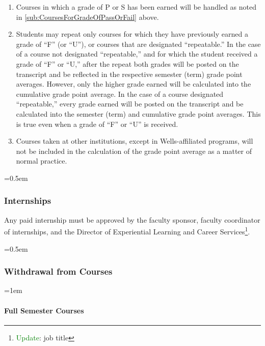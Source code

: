\documentclass{manual}
\newcommand{\modified}[1]{}
\let\oldsubsubsection\subsubsection
\renewcommand\subsubsection{\leftskip=0.5em\oldsubsubsection}
\let\oldparagraph\paragraph
\renewcommand\paragraph{\leftskip=1em\oldparagraph}
\newcommand{\editRemark}[3]{\textcolor{green}{#2}\footnote{\textcolor{green}{#1}: #3}}
\begin{document}
\begin{enumerate}[label=\arabic*]
\item Courses in which a grade of P or S has been earned will be handled as noted in \cref{sub:CoursesForGradeOfPassOrFail} above.

\item Students may repeat only courses for which they have previously earned a grade\modified{4/8/03}  of ``F'' (or ``U''), or courses that are designated ``repeatable.'' In the case of a course not designated ``repeatable,'' and for which the student received a grade of ``F'' or ``U,'' after the repeat both grades will be posted on the transcript and be reflected in the respective semester (term) grade point averages. However, only the higher grade earned will be calculated into the cumulative grade point average. In the case of a course designated ``repeatable,'' every grade earned will be posted on the transcript and be calculated into the semester (term) and cumulative grade point averages. This is true even when a grade of ``F'' or ``U'' is received.

\item Courses taken at other institutions, except in Wells-affiliated programs, will not be included in the calculation of the grade point average as a matter of normal practice.

\end{enumerate}

\subsubsection{Internships}\modified{5/13/93}

Any paid internship must be approved by the faculty sponsor, faculty coordinator of internships, and the Director of Experiential Learning and Career Services\editRemark{Update}{}{job title}.

\subsubsection{Withdrawal from Courses}


\paragraph{Full Semester Courses}
\end{document}
